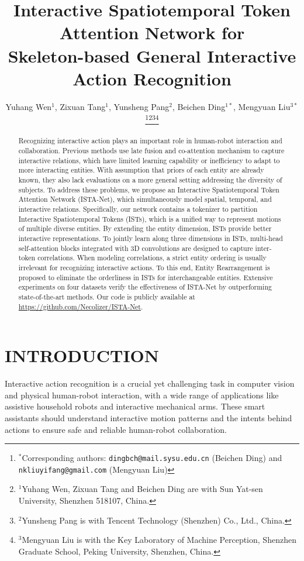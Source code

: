 \documentclass[letterpaper, 10 pt, conference]{ieeeconf}
\title{\LARGE \bf
Interactive Spatiotemporal Token Attention Network for \protect\\ Skeleton-based General Interactive Action Recognition
}
\author{Yuhang Wen$^{1}$, Zixuan Tang$^{1}$, Yunsheng Pang$^{2}$, Beichen Ding$^{1*}$, Mengyuan Liu$^{3*}$\thanks{$^{*}$Corresponding authors: {\tt\small dingbch@mail.sysu.edu.cn} (Beichen Ding) and {\tt\small nkliuyifang@gmail.com} (Mengyuan Liu)}\thanks{$^{1}$Yuhang Wen, Zixuan Tang and Beichen Ding are with Sun Yat-sen University, Shenzhen 518107, China.}\thanks{$^{2}$Yunsheng Pang is with Tencent Technology (Shenzhen) Co., Ltd., China.}\thanks{$^{3}$Mengyuan Liu is with the Key Laboratory of Machine Perception, Shenzhen Graduate School, Peking University, Shenzhen, China.}}
\begin{document}
\maketitle
\thispagestyle{empty}
\pagestyle{empty}


\begin{abstract}
Recognizing interactive action plays an important role in human-robot interaction and collaboration. Previous methods use late fusion and co-attention mechanism to capture interactive relations, which have limited learning capability or inefficiency to adapt to more interacting entities. With assumption that priors of each entity are already known, they also lack evaluations on a more general setting addressing the diversity of subjects. To address these problems, we propose an Interactive Spatiotemporal Token Attention Network (ISTA-Net), which simultaneously model spatial, temporal, and interactive relations. Specifically, our network contains a tokenizer to partition Interactive Spatiotemporal Tokens (ISTs), which is a unified way to represent motions of multiple diverse entities. By extending the entity dimension, ISTs provide better interactive representations. To jointly learn along three dimensions in ISTs, multi-head self-attention blocks integrated with 3D convolutions are designed to capture inter-token correlations. When modeling correlations, a strict entity ordering is usually irrelevant for recognizing interactive actions. To this end, Entity Rearrangement is proposed to eliminate the orderliness in ISTs for interchangeable entities. Extensive experiments on four datasets verify the effectiveness of ISTA-Net by outperforming state-of-the-art methods. Our code is publicly available at \url{https://github.com/Necolizer/ISTA-Net}.
\end{abstract}


\section{INTRODUCTION}

Interactive action recognition is a crucial yet challenging task in computer vision and physical human-robot interaction\cite{9636389,9636110,zheng2017image,DBLP:conf/iros/XingB22}, with a wide range of applications like assistive household robots\cite{9636381} and interactive mechanical arms\cite{7554295}. These smart assistants should understand interactive motion patterns and the intents behind actions to ensure safe and reliable human-robot collaboration\cite{9636107,9636553}.
\end{document}
